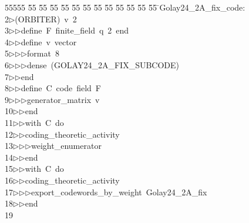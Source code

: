 %
%
\begin{tabbing}
55555 \= 55 \= 55 \= 55 \= 55 \= 55 \= 55 \= 55 \= 55 \= 55 \= 55 \= 55 \= 55 \= \>Golay24\_2A\_fix\_code:\\[0pt]
2\>$\triangleright$\>(ORBITER)\ v\ 2\ \\[0pt]
3\>$\triangleright$\>$\triangleright$\>define\ F\ finite\_field\ q\ 2\ end\ \\[0pt]
4\>$\triangleright$\>$\triangleright$\>define\ v\ vector\ \\[0pt]
5\>$\triangleright$\>$\triangleright$\>$\triangleright$\>format\ 8\ \\[0pt]
6\>$\triangleright$\>$\triangleright$\>$\triangleright$\>dense\ (GOLAY24\_2A\_FIX\_SUBCODE)\ \\[0pt]
7\>$\triangleright$\>$\triangleright$\>end\ \\[0pt]
8\>$\triangleright$\>$\triangleright$\>define\ C\ code\ field\ F\ \\[0pt]
9\>$\triangleright$\>$\triangleright$\>$\triangleright$\>generator\_matrix\ v\ \\[0pt]
10\>$\triangleright$\>$\triangleright$\>end\ \\[0pt]
11\>$\triangleright$\>$\triangleright$\>with\ C\ do\ \\[0pt]
12\>$\triangleright$\>$\triangleright$\>coding\_theoretic\_activity\ \\[0pt]
13\>$\triangleright$\>$\triangleright$\>$\triangleright$\>weight\_enumerator\ \\[0pt]
14\>$\triangleright$\>$\triangleright$\>end\ \\[0pt]
15\>$\triangleright$\>$\triangleright$\>with\ C\ do\ \\[0pt]
16\>$\triangleright$\>$\triangleright$\>coding\_theoretic\_activity\ \\[0pt]
17\>$\triangleright$\>$\triangleright$\>$\triangleright$\>export\_codewords\_by\_weight\ Golay24\_2A\_fix\ \\[0pt]
18\>$\triangleright$\>$\triangleright$\>end\\[0pt]
19\>\end{tabbing}
